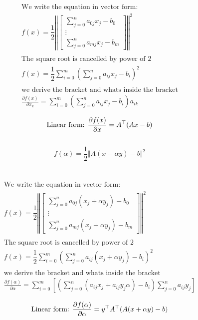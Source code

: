 \documentclass[12pt]{article}         %
\begin{document}
$$
\begin{aligned}
\text{We write the equation in vector form:}\\
f(x) = \dfrac{1}{2}\left\Vert
  \begin{bmatrix}
 \sum_{j=0}^{n}a_{0j}x_j - b_0\\
\vdots\\
  \sum_{j=0}^{n}a_{mj}x_j - b_m
   \end{bmatrix}
\right\Vert^2\\\\
\text{The square root is cancelled by power of 2}\\
f(x) = \dfrac{1}{2}\sum_{i=0}^{m}\left(\sum_{j=0}^{n}a_{ij}x_j - b_i\right)^2\\\\
\text{we derive the bracket and whats inside the bracket}\\
\frac {\partial f(x)}{\partial x_k} = \sum_{i=0}^{m}\left(\sum_{j=0}^{n}a_{ij}x_j - b_i\right)a_{ik}\\
\end{aligned}
$$
$$
\text{Linear form: }\\
	\frac {\partial f(x)}{\partial x}  = A^\top(Ax - b)
$$\\
\begin{equation}
	f(\alpha) = \dfrac{1}{2}\Vert A(x - \alpha y) - b\Vert^2
\end{equation}
\\
\\
$$
\begin{aligned}
\text{We write the equation in vector form:}\\
f(x) = \dfrac{1}{2}\left\Vert
  \begin{bmatrix}
 \sum_{j=0}^{n}a_{0j}(x_j + \alpha y_j) - b_0\\
\vdots\\
  \sum_{j=0}^{n}a_{mj}(x_j + \alpha y_j) - b_m
   \end{bmatrix}
\right\Vert^2\\\\
\text{The square root is cancelled by power of 2}\\
f(x) = \dfrac{1}{2}\sum_{i=0}^{m}\left(\sum_{j=0}^{n}a_{ij}(x_j + \alpha y_j) - b_i\right)^2\\\\
\text{we derive the bracket and whats inside the bracket}\\
\frac {\partial f(\alpha)}{\partial \alpha} = \sum_{i=0}^{m}\left[ \left( \sum_{j=0}^{n}(a_{ij}x_j +a_{ij}y_j\alpha) - b_i\right)\sum_{j=0}^{n}a_{ij}y_j\right]\\
\end{aligned}
$$
$$
\text{Linear form: }\\
	\frac {\partial f(\alpha)}{\partial \alpha} = y^\top A^\top(A(x +\alpha y) - b)
$$
\end{document}
